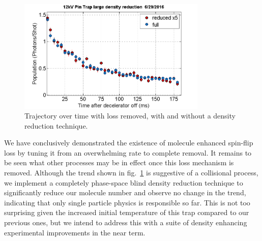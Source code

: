 \documentclass[%
 reprint,
 amsmath,amssymb,
 aps,
prl,
]{revtex4-1}
\begin{document}
\begin{figure}
\includegraphics[width=90mm]{reduce-density-compare.png}%
\caption{
Trajectory over time with loss removed, with and without a density reduction technique.
\label{fig:timetrace}}
\end{figure}

We have conclusively demonstrated the existence of molecule enhanced spin-flip loss by tuning it from an overwhelming rate to complete removal. It remains to be seen what other processes may be in effect once this loss mechanism is removed. Although the trend shown in fig.~\ref{fig:timetrace} is suggestive of a collisional process, we implement a completely phase-space blind density reduction technique to significantly reduce our molecule number and observe no change in the trend, indicating that only single particle physics is responsible so far. This is not too surprising given the increased initial temperature of this trap compared to our previous ones, but we intend to address this with a suite of density enhancing experimental improvements in the near term.

\nocite{*}


\end{document}
